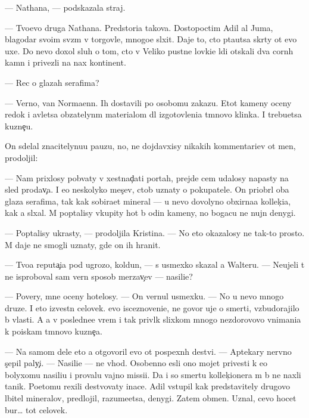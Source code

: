 \documentclass[10pt]{book}
\begin{document}
— Nathana, — podskazala straj.

— Tvo{\y}evo druga Nathana. Pred{\yi}stori{\y}a takova. Dostopoctim{\yi}{\y} Adil al Juma, blagodar{\ia} svo{\y}im sv{\ia}z{\ia}m v torgovle, mnogo{\y}e sl{\yi}xit. Daje to, cto p{\yi}ta{\y}utsa skr{\yi}ty ot {\y}evo uxe{\y}. Do nevo doxol sluh o tom, cto v Veliko{\y} pust{\yi}ne lovki{\y}e l{\iu}di ot{\yi}skali dva corn{\yi}h kamn{\ia} i privezli na nax kontinent.

— Rec o glazah serafima?

— Verno, van Normaenn. Ih dostavili po osobomu zakazu. Etot kameny oceny redok i {\y}avl{\ia}{\y}etsa ob{\ia}zatelyn{\yi}m materialom dl{\ia} izgotovleni{\y}a t{\e}mnovo klinka. I trebu{\y}etsa kuzne{\c}u.

On sdelal znacitelynu{\y}u pauzu, no, ne dojdavxisy nikakih kommentari{\y}ev ot men{\ia}, prodoljil:

— Nam prixlosy pob{\yi}vaty v xestnad{\c}ati portah, prejde cem udalosy napasty na sled prodav{\c}a. I {\y}e{\x}o neskolyko mes{\ia}{\c}ev, ctob{\yi} uznaty o pokupatele. On priobr{\e}l oba glaza serafima, tak kak sobira{\y}et mineral{\yi} — u nevo dovolyno obxirna{\y}a kollek{\c}i{\y}a, kak {\y}a sl{\yi}xal. M{\yi} pop{\yi}talisy v{\yi}kupity hot{\ia} b{\yi} odin kameny, no bogacu ne nujn{\yi} denygi.

— Pop{\yi}talisy ukrasty, — prodoljila Kristina. — No eto okazalosy ne tak-to prosto. M{\yi} daje ne smogli uznaty, gde on ih hranit.

— Tvo{\y}a reputa{\c}i{\y}a pod ugrozo{\y}, koldun, — s usmexko{\y} skazal {\y}a Walteru. — Neujeli t{\yi} ne isproboval sam{\yi}{\y} vern{\yi}{\y} sposob merzav{\c}ev — nasili{\y}e?

— Povery, mne oceny hotelosy. — On vernul usmexku. — No u nevo mnogo druze{\y}. I eto izvestn{\yi}{\y} celovek. {\Y}evo isceznoveni{\y}e, ne govor{\ia} uje o smerti, vzbudorajilo b{\yi} vlasti. A {\y}a v posledne{\y}e vrem{\ia} i tak privl{\e}k slixkom mnogo nezdorovovo vnimani{\y}a k poiskam t{\e}mnovo kuzne{\c}a.

— Na samom dele eto {\y}a otgovoril {\y}evo ot pospexn{\yi}h de{\y}stvi{\y}. — Aptekary nervno s{\c}epil paly{\c}i. — Nasili{\y}e — ne v{\yi}hod. Osobenno {\y}esli ono mojet privesti k {\y}e{\x}o bolyxomu nasili{\y}u i provalu vajno{\y} missi{\y}i. Da i so smert{\y}u kollek{\c}ionera m{\yi} b{\yi} ne naxli ta{\y}nik. Poetomu rexili de{\y}stvovaty inace. Adil v{\yi}stupil kak predstavitely drugovo l{\iu}bitel{\ia} mineralov, predlojil, razume{\y}etsa, denygi. Zatem obmen. Uznal, cevo hocet bur… tot celovek.
\end{document}
